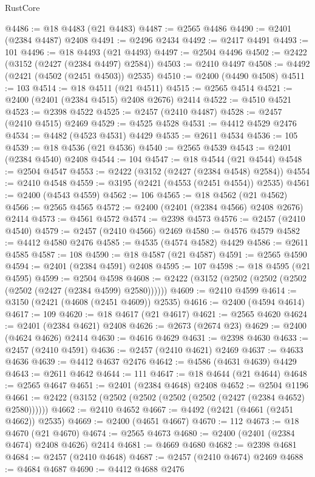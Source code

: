 \begin{lexlean}{RustCore}
\begin{coremodule}
@4486 := @18 @4483 (@21 @4483)
@4487 := @2565 @4486
@4490 := @2401 (@2384 @4487) @2408
@4491 := @2496 @2434
@4492 := @2417 @4491
@4493 := 101
@4496 := @18 @4493 (@21 @4493)
@4497 := @2504 @4496
@4502 := @2422 (@3152 (@2427 (@2384 @4497) @2584))
@4503 := @2410 @4497
@4508 := @4492 (@2421 (@4502 (@2451 @4503)) @2535)
@4510 := @2400 (@4490 @4508)
@4511 := 103
@4514 := @18 @4511 (@21 @4511)
@4515 := @2565 @4514
@4521 := @2400 (@2401 (@2384 @4515) @2408 @2676) @2414
@4522 := @4510 @4521
@4523 := @2398 @4522
@4525 := @2457 (@2410 @4487)
@4528 := @2457 (@2410 @4515) @2469
@4529 := @4525 @4528
@4531 := @4412 @4529 @2476
@4534 := @4482 (@4523 @4531) @4429
@4535 := @2611 @4534
@4536 := 105
@4539 := @18 @4536 (@21 @4536)
@4540 := @2565 @4539
@4543 := @2401 (@2384 @4540) @2408
@4544 := 104
@4547 := @18 @4544 (@21 @4544)
@4548 := @2504 @4547
@4553 := @2422 (@3152 (@2427 (@2384 @4548) @2584))
@4554 := @2410 @4548
@4559 := @3195 (@2421 (@4553 (@2451 @4554)) @2535)
@4561 := @2400 (@4543 @4559)
@4562 := 106
@4565 := @18 @4562 (@21 @4562)
@4566 := @2565 @4565
@4572 := @2400 (@2401 (@2384 @4566) @2408 @2676) @2414
@4573 := @4561 @4572
@4574 := @2398 @4573
@4576 := @2457 (@2410 @4540)
@4579 := @2457 (@2410 @4566) @2469
@4580 := @4576 @4579
@4582 := @4412 @4580 @2476
@4585 := @4535 (@4574 @4582) @4429
@4586 := @2611 @4585
@4587 := 108
@4590 := @18 @4587 (@21 @4587)
@4591 := @2565 @4590
@4594 := @2401 (@2384 @4591) @2408
@4595 := 107
@4598 := @18 @4595 (@21 @4595)
@4599 := @2504 @4598
@4608 := @2422 (@3152 (@2502 (@2502 (@2502 (@2502 (@2427 (@2384 @4599) @2580))))))
@4609 := @2410 @4599
@4614 := @3150 (@2421 (@4608 (@2451 @4609)) @2535)
@4616 := @2400 (@4594 @4614)
@4617 := 109
@4620 := @18 @4617 (@21 @4617)
@4621 := @2565 @4620
@4624 := @2401 (@2384 @4621) @2408
@4626 := @2673 (@2674 @23)
@4629 := @2400 (@4624 @4626) @2414
@4630 := @4616 @4629
@4631 := @2398 @4630
@4633 := @2457 (@2410 @4591)
@4636 := @2457 (@2410 @4621) @2469
@4637 := @4633 @4636
@4639 := @4412 @4637 @2476
@4642 := @4586 (@4631 @4639) @4429
@4643 := @2611 @4642
@4644 := 111
@4647 := @18 @4644 (@21 @4644)
@4648 := @2565 @4647
@4651 := @2401 (@2384 @4648) @2408
@4652 := @2504 @1196
@4661 := @2422 (@3152 (@2502 (@2502 (@2502 (@2502 (@2427 (@2384 @4652) @2580))))))
@4662 := @2410 @4652
@4667 := @4492 (@2421 (@4661 (@2451 @4662)) @2535)
@4669 := @2400 (@4651 @4667)
@4670 := 112
@4673 := @18 @4670 (@21 @4670)
@4674 := @2565 @4673
@4680 := @2400 (@2401 (@2384 @4674) @2408 @4626) @2414
@4681 := @4669 @4680
@4682 := @2398 @4681
@4684 := @2457 (@2410 @4648)
@4687 := @2457 (@2410 @4674) @2469
@4688 := @4684 @4687
@4690 := @4412 @4688 @2476

\end{coremodule}
\end{lexlean}
